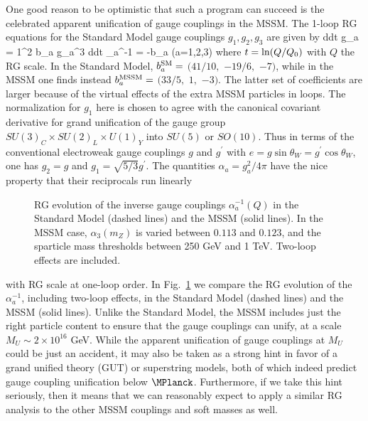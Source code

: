 One good reason to be optimistic that such a program can succeed
is the celebrated apparent unification of gauge
couplings
in the MSSM. \cite{gaugeunification}
The 1-loop RG equations for the
Standard Model gauge couplings $g_1, g_2, g_3$ are given by
\beq
{d\over dt} g_a =  {1\pi^2} b_a g_a^3 \qquad
\! \Rightarrow \qquad \! {d\over dt} \alpha_a^{-1} =
-{b_a\pi} \qquad\qquad (a=1,2,3)
\qquad
\label{mssmg}
\eeq
where $t= {\rm ln} (Q/Q_0)$ with $Q$ the RG scale.
In the Standard Model,
$b^{\rm SM}_a =$ $(41/10,$ $-19/6,$ $-7)$, while in the MSSM
one finds instead
$b^{\rm MSSM}_a =$ $(33/5,$ $1,$ $-3)$.
The latter set of coefficients are
larger because of the virtual effects of the extra MSSM particles in
loops.
The normalization for
$g_1$ here is chosen to agree with the canonical covariant derivative for
grand
unification of the gauge group
$SU(3)_C \times SU(2)_L\times U(1)_Y$
into $SU(5)$ or $SO(10)$.
Thus in terms of the
conventional electroweak gauge couplings $g$ and $g^\prime$ with
$e = g\sin\theta_W = g^\prime \cos\theta_W$,
one has $g_2=g$ and $g_1 = \sqrt{5/3} g^\prime$. The quantities $\alpha_a
= g_a^2/4\pi$ have the nice property that their reciprocals run linearly
\begin{figure}
\centerline{}
\caption{RG evolution of the inverse gauge couplings
$\alpha_a^{-1}(Q)$ in the Standard Model (dashed lines) and the MSSM
(solid lines). In the MSSM case, $\alpha_3(m_Z)$ is varied between
$0.113$ and $0.123$, and the sparticle mass thresholds between
250 GeV and 1 TeV. Two-loop effects are included.
\label{fig:gaugeunification}}
\end{figure}
with RG scale at one-loop order.
In Fig.~\ref{fig:gaugeunification} we compare
the RG evolution of the $\alpha_a^{-1}$, including two-loop effects, in
the
Standard Model (dashed lines) and the MSSM (solid lines).
Unlike the Standard Model, the MSSM includes just the right
particle content to ensure that the gauge couplings can unify, at a scale
$M_U \sim 2\times 10^{16}$ GeV.
While the apparent unification of gauge couplings at $M_U$ could be just
an accident,
it may also be taken as a strong hint in favor of a grand unified theory
(GUT) or superstring models, both of which indeed predict gauge coupling
unification below $\MPlanck$. Furthermore, if we take this hint
seriously, then it means that we can reasonably expect to apply a similar
RG analysis to the other MSSM couplings and soft masses as well.

